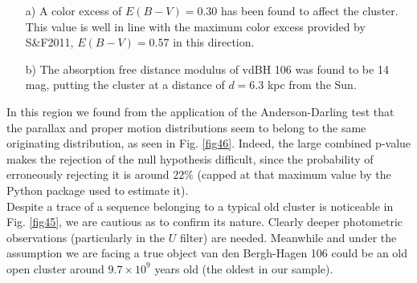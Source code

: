 \documentclass[draft]{aa}
\begin{document}
\begin{itemize}
\item [a)] A color excess of $E(B-V) = 0.30$ has been found to affect the
cluster. This value is well in line with the maximum color excess provided
by S\&F2011, $E(B-V) = 0.57$ in this direction.
\item [b)] The absorption free distance modulus of vdBH 106 was found to be
14 mag, putting the cluster at a distance of $d=6.3$ kpc from the Sun.
\end{itemize}

In this region we found from the application of the Anderson-Darling test that
the parallax and proper motion distributions seem to belong to the same
originating distribution, as seen in Fig. \ref{fig46}. Indeed, the
large combined p-value makes the rejection of the null hypothesis difficult,
since the probability of erroneously rejecting it is around $22\%$ (capped
at that maximum value by the Python package used to estimate it).\\

Despite a trace of a sequence belonging to a typical old cluster is
noticeable in Fig. \ref{fig45}, we are cautious as to confirm its nature.
Clearly deeper photometric observations (particularly in the $U$ filter) are
needed. Meanwhile and under the assumption we are facing a true object van
den Bergh-Hagen 106 could be an old open cluster around $9.7\times10^9$ years
old (the oldest in our sample).
\end{document}

